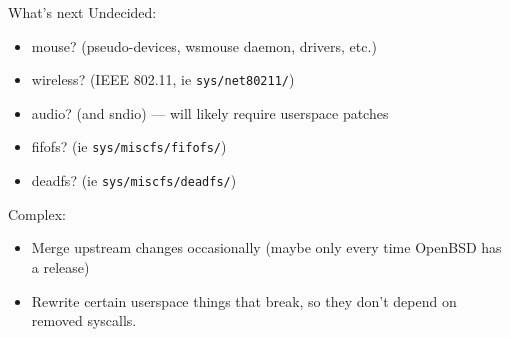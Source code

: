 \documentclass{beamer}
\begin{document}
\begin{frame}{What's next}
	Undecided:
	\begin{itemize}
		\item mouse? (pseudo-devices, wsmouse daemon, drivers, etc.)
		\item wireless? (IEEE 802.11, ie \texttt{sys/net80211/})
		\item audio? (and sndio) --- will likely require userspace patches
		\item fifofs? (ie \texttt{sys/miscfs/fifofs/})
		\item deadfs? (ie \texttt{sys/miscfs/deadfs/})
	\end{itemize}

	Complex:
	\begin{itemize}
		\item Merge upstream changes occasionally (maybe only every time OpenBSD has a release)
		\item Rewrite certain userspace things that break, so they don't depend on removed syscalls.
	\end{itemize}
\end{frame}
\end{document}

